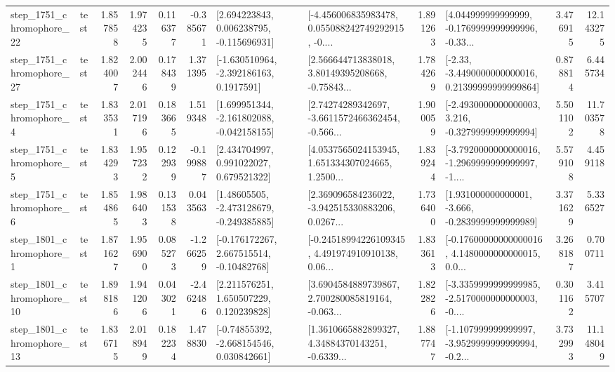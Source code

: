 \begin{tabular}{llrrrrllrlrr}
 step\_1751\_chromophore\_22 &      test &      1.857858 &    1.974235 &      0.116377 & -0.385671 &    [2.694223843, 0.006238795, -0.115696931] &  [-4.456006835983478, 0.055088242749292915, -0.... &       1.891263 &  [4.044999999999999, -0.1769999999999996, -0.33... &            3.476915 &         12.143275 \\
 step\_1751\_chromophore\_27 &      test &      1.824007 &    2.002446 &      0.178439 &  1.371395 &     [-1.630510964, -2.392186163, 0.1917591] &  [2.566644713838018, 3.80149395208668, -0.75843... &       1.784269 &  [-2.33, -3.4490000000000016, 0.21399999999999864] &            0.878814 &          6.445734 \\
  step\_1751\_chromophore\_4 &      test &      1.833531 &    2.017196 &      0.183665 &  1.519348 &   [1.699951344, -2.161802088, -0.042158155] &  [2.74274289342697, -3.6611572466362454, -0.566... &       1.900059 &  [-2.4930000000000003, 3.216, -0.3279999999999994] &            5.501102 &         11.703578 \\
  step\_1751\_chromophore\_5 &      test &      1.834293 &    1.957232 &      0.122939 & -0.199887 &     [2.434704997, 0.991022027, 0.679521322] &  [4.0537565024153945, 1.651334307024665, 1.2500... &       1.839244 &  [-3.7920000000000016, -1.2969999999999997, -1.... &            5.579108 &          4.459118 \\
  step\_1751\_chromophore\_6 &      test &      1.854865 &    1.986403 &      0.131538 &  0.043563 &    [1.48605505, -2.473128679, -0.249385885] &  [2.369096584236022, -3.942515330883206, 0.0267... &       1.736400 &   [1.931000000000001, -3.666, -0.2839999999999989] &            3.371629 &          5.336527 \\
  step\_1801\_chromophore\_1 &      test &      1.871627 &    1.956900 &      0.085273 & -1.266259 &    [-0.176172267, 2.667515514, -0.10482768] &  [-0.24518994226109345, 4.491974910910138, 0.06... &       1.833613 &  [-0.17600000000000016, 4.1480000000000015, 0.0... &            3.268187 &          0.700711 \\
 step\_1801\_chromophore\_10 &      test &      1.898186 &    1.941206 &      0.043021 & -2.462486 &     [2.211576251, 1.650507229, 0.120239828] &  [3.6904584889739867, 2.700280085819164, -0.063... &       1.822826 &  [-3.3359999999999985, -2.5170000000000003, -0.... &            0.301162 &          3.415707 \\
 step\_1801\_chromophore\_13 &      test &      1.836715 &    2.018949 &      0.182234 &  1.478830 &    [-0.74855392, -2.668154546, 0.030842661] &  [1.3610665882899327, 4.34884370143251, -0.6339... &       1.887747 &  [-1.107999999999997, -3.9529999999999994, -0.2... &            3.732993 &         11.148049 \\

\end{tabular}

